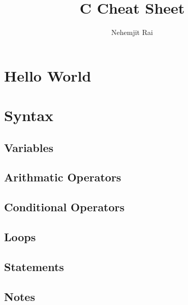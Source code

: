 \documentclass[12pt]{article}
\begin{document}
\title{C Cheat Sheet}
\author{Nehemjit Rai}
\maketitle

\pagebreak 
\tableofcontents

\section{Hello World}


\section{Syntax}
\subsection{Variables}

\subsection{Arithmatic Operators}

\subsection{Conditional Operators}

\subsection{Loops}

\subsection{Statements}

\subsection{Notes}
\end{document}
